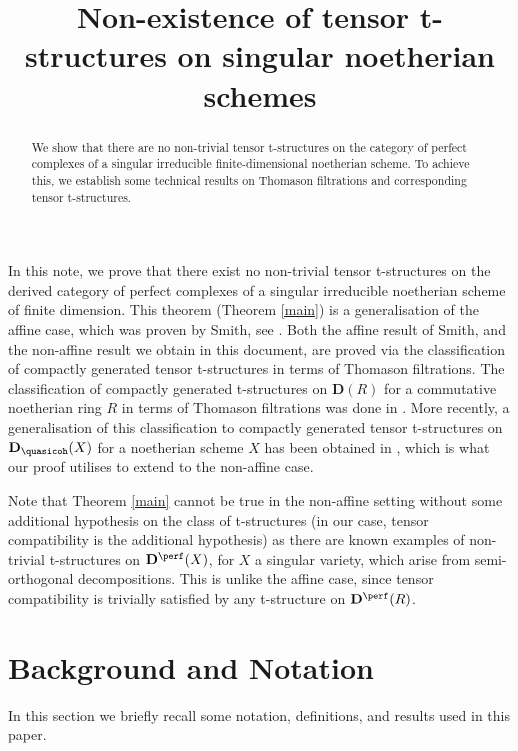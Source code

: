 
\title{Non-existence of tensor t-structures on singular noetherian schemes}
\maketitle

 \begin{abstract}
     We show that there are no non-trivial tensor t-structures on the category of perfect complexes of a singular irreducible finite-dimensional noetherian scheme. To achieve this, we establish some technical results on Thomason filtrations and corresponding tensor t-structures.
 \end{abstract}
In this note, we prove that there exist no non-trivial tensor t-structures on the derived category of perfect complexes of a singular irreducible noetherian scheme of finite dimension. This theorem (Theorem \ref{main}) is a generalisation of the affine case, which was proven by Smith, see  \cite[Theorem 6.5]{smith2019bounded}. Both the affine result of Smith, and the non-affine result we obtain in this document, are proved via the classification of compactly generated tensor t-structures in terms of Thomason filtrations. The classification of compactly generated t-structures on $\mathbf{D}(R)$ for a commutative noetherian ring $R$ in terms of Thomason filtrations was done in \cite[Theorem 3.11]{Alonso_Tarr_o_2010}. More recently, a generalisation of this classification to compactly generated tensor t-structures on $\mathbf{D}_{\quasicoh}(X)$ for a noetherian scheme $X$ has been obtained in \cite[Theorem 4.11]{sahoo2023compactly}, which is what our proof utilises to extend to the non-affine case. 


Note that Theorem \ref{main} cannot be true in the non-affine setting without some additional hypothesis on the class of t-structures (in our case, tensor compatibility is the additional hypothesis) as there are known examples of non-trivial t-structures on $\mathbf{D}^{\perf}(X)$, for $X$ a singular variety, which arise from semi-orthogonal decompositions. This is unlike the affine case, since tensor compatibility is trivially satisfied by any t-structure on $\mathbf{D}^{\perf}(R)$.

\section{Background and Notation}
In this section we briefly recall some notation, definitions, and results used in this paper.

